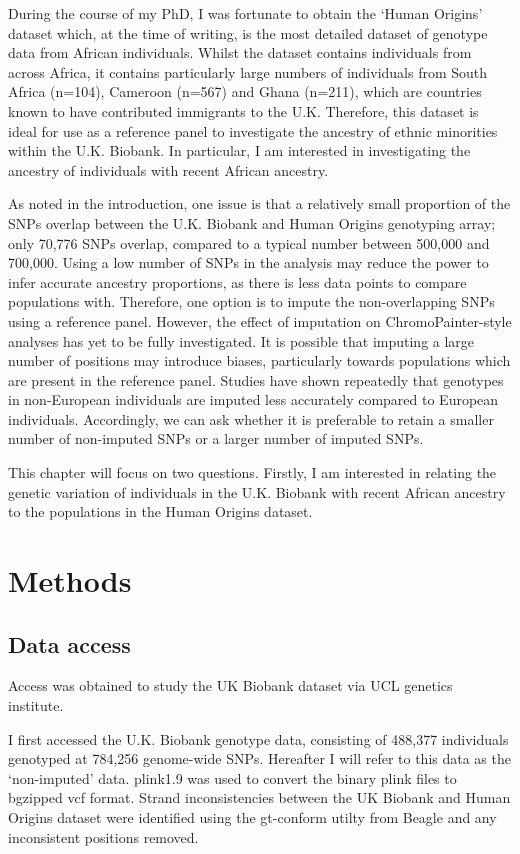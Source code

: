 During the course of my PhD, I was fortunate to obtain the `Human Origins' dataset which, at the time of writing, is the most detailed dataset of genotype data from African individuals. Whilst the dataset contains individuals from across Africa, it contains particularly large numbers of individuals from South Africa (n=104), Cameroon (n=567) and Ghana (n=211), which are countries known to have contributed immigrants to the U.K. Therefore, this dataset is ideal for use as a reference panel to investigate the ancestry of ethnic minorities within the U.K. Biobank. In particular, I am interested in investigating the ancestry of individuals with recent African ancestry. 

As noted in the introduction, one issue is that a relatively small proportion of the SNPs overlap between the U.K. Biobank and Human Origins genotyping array; only 70,776 SNPs overlap, compared to a typical number between 500,000 and 700,000. Using a low number of SNPs in the analysis may reduce the power to infer accurate ancestry proportions, as there is less data points to compare populations with. Therefore, one option is to impute the non-overlapping SNPs using a reference panel. However, the effect of imputation on ChromoPainter-style analyses has yet to be fully investigated. It is possible that imputing a large number of positions may introduce biases, particularly towards populations which are present in the reference panel. Studies have shown repeatedly that genotypes in non-European individuals are imputed less accurately compared to European individuals. Accordingly, we can ask whether it is preferable to retain a smaller number of non-imputed SNPs or a larger number of imputed SNPs. 

This chapter will focus on two questions. Firstly, I am interested in relating the genetic variation of individuals in the U.K. Biobank with recent African ancestry to the populations in the Human Origins dataset. 


\section{Methods}

\subsection{Data access}

Access was obtained to study the UK Biobank dataset via UCL genetics institute. 

I first accessed the U.K. Biobank genotype data, consisting of 488,377 individuals genotyped at 784,256 genome-wide SNPs. Hereafter I will refer to this data as the `non-imputed' data. plink1.9 \cite{purcell2007plink} was used to convert the binary plink files to bgzipped vcf format. Strand inconsistencies between the UK Biobank and Human Origins dataset were identified using the gt-conform utilty from Beagle and any inconsistent positions removed. 

